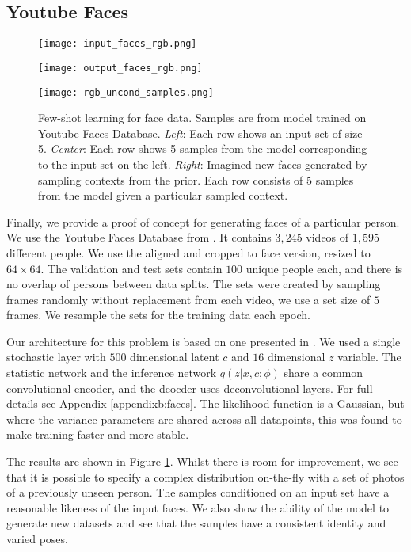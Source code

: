 \documentclass{article} \usepackage{iclr2017_conference,times}
\begin{document}
\subsection{Youtube Faces}

\begin{figure}[!hb]
\centering
\begin{minipage}{0.3\textwidth}
\texttt{[image: input\_faces\_rgb.png]}
\end{minipage}
\begin{minipage}{0.3\textwidth}
\texttt{[image: output\_faces\_rgb.png]}
\end{minipage}
\begin{minipage}{0.3\textwidth}
\texttt{[image: rgb\_uncond\_samples.png]}
\end{minipage}
\caption{Few-shot learning for face data. Samples are from model trained on Youtube Faces Database. \emph{Left}: Each row shows an input set of size 5. \emph{Center}: Each row shows 5 samples from the model corresponding to the input set on the left. \emph{Right}: Imagined new faces generated by sampling contexts from the prior. Each row consists of 5 samples from the model given a particular sampled context. \label{fig:table_faces}}
\end{figure}
Finally, we provide a proof of concept for generating faces of a particular person. We use the Youtube Faces Database from \citet{youtube_faces}. It contains $3,245$ videos of $1,595$ different people. We use the aligned and cropped to face version, resized to $64 \times 64$. The validation and test sets contain $100$ unique people each, and there is no overlap of persons between data splits. The sets were created by sampling frames randomly without replacement from each video, we use a set size of $5$ frames. We resample the sets for the training data each epoch.

Our architecture for this problem is based on one presented in \cite{discgen}. We used a single stochastic layer with $500$ dimensional latent $c$ and $16$ dimensional $z$ variable. The statistic network and the inference network $q(z | x,c ; \phi)$ share a common convolutional encoder, and the deocder uses deconvolutional layers. For full details see Appendix \ref{appendixb:faces}. The likelihood function is a Gaussian, but where the variance parameters are shared across all datapoints, this was found to make training faster and more stable.

The results are shown in Figure \ref{fig:table_faces}. Whilst there is room for improvement, we see that it is possible to specify a complex distribution on-the-fly with a set of photos of a previously unseen person. The samples conditioned on an input set have a reasonable likeness of the input faces. We also show the ability of the model to generate new datasets and see that the samples have a consistent identity and varied poses. 
\vspace{-1em}
\end{document}
